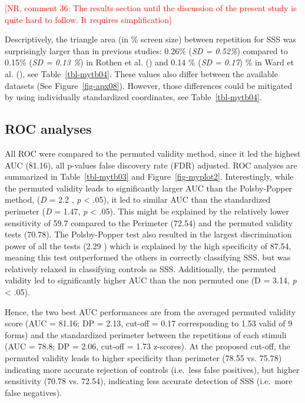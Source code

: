 \documentclass[
  man,
  longtable,
  a4paper,
  nolmodern,
  notxfonts,
  notimes,
  colorlinks=true,linkcolor=blue,citecolor=blue,urlcolor=blue]{apa7}
\begin{document}
\textcolor{red}{[NR, comment 36: The results section until the discussion of the present study is quite hard to follow. It requires simplification]}

Descriptively, the triangle area (in \% screen size) between repetition
for SSS was surprisingly larger than in previous studies: 0.26\%
(\emph{SD = 0.52\%}) compared to 0.15\% (\emph{SD = 0.13 \%}) in Rothen
et al. () and 0.14 \% (\emph{SD = 0.17})
\% in Ward et al. (), see
Table~\ref{tbl-mytb04}. These values also differ between the available
datasets (See Figure~\ref{fig-apx08}). However, those differences could
be mitigated by using individually standardized coordinates, see
Table~\ref{tbl-mytb04}.

\subsection{ROC analyses}\label{roc-analyses}

All ROC were compared to the permuted validity method, since it led the
highest AUC (81.16), all p-values false discovery rate (FDR) adjusted.
ROC analyses are summarized in Table~\ref{tbl-mytb03} and
Figure~\ref{fig-myplot2}. Interestingly, while the permuted validity
leads to significantly larger AUC than the Polsby-Popper method,
(\emph{D} = 2.2 , \emph{p} \textless{} .05), it led to similar AUC than
the standardized perimeter (\emph{D} = 1.47, \emph{p} \textless{} .05).
This might be explained by the relatively lower sensitivity of 59.7
compared to the Perimeter (72.54) and the permuted validity tests
(70.78). The Polsby-Popper test also resulted in the largest
discrimination power of all the tests (2.29 ) which is explained by the
high specificity of 87.54, meaning this test outperformed the others in
correctly classifying SSS, but was relatively relaxed in classifying
controls as SSS. Additionally, the permuted validity led to
significantly higher AUC than the non permuted one (D = 3.14, \emph{p}
\textless{} .05).

Hence, the two best AUC performances are from the averaged permuted
validity score (AUC = 81.16; DP = 2.13, cut-off = 0.17 corresponding to
1.53 valid of 9 forms) and the standardized perimeter between the
repetitions of each stimuli (AUC = 78.8; DP = 2.06, cut-off = 1.73
z-scores). At the proposed cut-off, the permuted validity leads to
higher specificity than perimeter (78.55 vs. 75.78) indicating more
accurate rejection of controls (i.e.~less false positives), but higher
sensitivity (70.78 vs. 72.54), indicating less accurate detection of SSS
(i.e.~more false negatives).
\end{document}

